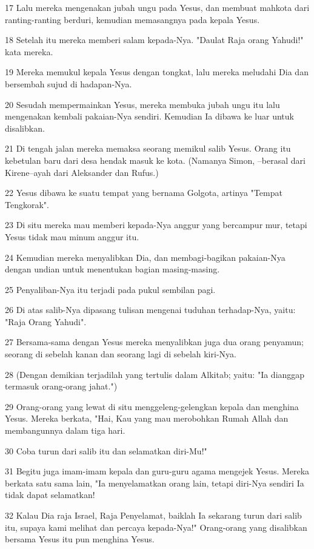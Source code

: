 \par 17 Lalu mereka mengenakan jubah ungu pada Yesus, dan membuat mahkota dari ranting-ranting berduri, kemudian memasangnya pada kepala Yesus.
\par 18 Setelah itu mereka memberi salam kepada-Nya. "Daulat Raja orang Yahudi!" kata mereka.
\par 19 Mereka memukul kepala Yesus dengan tongkat, lalu mereka meludahi Dia dan bersembah sujud di hadapan-Nya.
\par 20 Sesudah mempermainkan Yesus, mereka membuka jubah ungu itu lalu mengenakan kembali pakaian-Nya sendiri. Kemudian Ia dibawa ke luar untuk disalibkan.
\par 21 Di tengah jalan mereka memaksa seorang memikul salib Yesus. Orang itu kebetulan baru dari desa hendak masuk ke kota. (Namanya Simon, --berasal dari Kirene--ayah dari Aleksander dan Rufus.)
\par 22 Yesus dibawa ke suatu tempat yang bernama Golgota, artinya "Tempat Tengkorak".
\par 23 Di situ mereka mau memberi kepada-Nya anggur yang bercampur mur, tetapi Yesus tidak mau minum anggur itu.
\par 24 Kemudian mereka menyalibkan Dia, dan membagi-bagikan pakaian-Nya dengan undian untuk menentukan bagian masing-masing.
\par 25 Penyaliban-Nya itu terjadi pada pukul sembilan pagi.
\par 26 Di atas salib-Nya dipasang tulisan mengenai tuduhan terhadap-Nya, yaitu: "Raja Orang Yahudi".
\par 27 Bersama-sama dengan Yesus mereka menyalibkan juga dua orang penyamun; seorang di sebelah kanan dan seorang lagi di sebelah kiri-Nya.
\par 28 (Dengan demikian terjadilah yang tertulis dalam Alkitab; yaitu: "Ia dianggap termasuk orang-orang jahat.")
\par 29 Orang-orang yang lewat di situ menggeleng-gelengkan kepala dan menghina Yesus. Mereka berkata, "Hai, Kau yang mau merobohkan Rumah Allah dan membangunnya dalam tiga hari.
\par 30 Coba turun dari salib itu dan selamatkan diri-Mu!"
\par 31 Begitu juga imam-imam kepala dan guru-guru agama mengejek Yesus. Mereka berkata satu sama lain, "Ia menyelamatkan orang lain, tetapi diri-Nya sendiri Ia tidak dapat selamatkan!
\par 32 Kalau Dia raja Israel, Raja Penyelamat, baiklah Ia sekarang turun dari salib itu, supaya kami melihat dan percaya kepada-Nya!" Orang-orang yang disalibkan bersama Yesus itu pun menghina Yesus.
